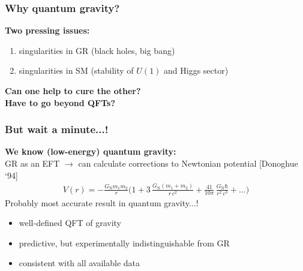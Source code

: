 \documentclass[]{beamer}  %
\newcommand\GNewton{ G_{\scriptscriptstyle{\mathrm{N}}}{} }
\begin{document}
\addtocounter{framenumber}{-1}
\begin{frame}
  \frametitle{Why quantum gravity?}
  \textbf{Two pressing issues:}
  \begin{enumerate}
    \item singularities in GR (black holes, big bang)
      \hspace{2cm}
    \item singularities in SM (stability of $U(1)$ and Higgs sector)
  \end{enumerate}
  \vfill
  \begin{center}
    \fontsize{12pt}{7.2}\selectfont
    \textbf{ Can one help to cure the other? } \\[15pt]
    \textbf{ Have to go beyond QFTs? }
  \end{center}
\end{frame}



\begin{frame}
  \frametitle{But wait a minute...!}

  \textbf{We know (low-energy) quantum gravity:}\\[5pt]
  GR as an EFT $\rightarrow$ can calculate corrections to Newtonian potential [Donoghue `94]
  \begin{align*}
    \boxed{
      V(r) = -\frac{\GNewton m_1 m_2}{r}
      \bigg(
        1
        + 3 \, \frac{\GNewton (m_1 + m_2)}{r \, c^2}
        + \frac{41}{10 \pi} \, \frac{\GNewton \hbar}{r^2 \, c^3}
        + \dots
      \bigg)
    }
  \end{align*}
  \hfill Probably most accurate result in quantum gravity...!
  \pause
  \vfill
  \begin{itemize}
    \item well-defined QFT of gravity\\[5pt]
    \item predictive, but experimentally indistinguishable from GR\\[5pt]
    \item consistent with all available data
  \end{itemize}
\end{frame}
\end{document}

